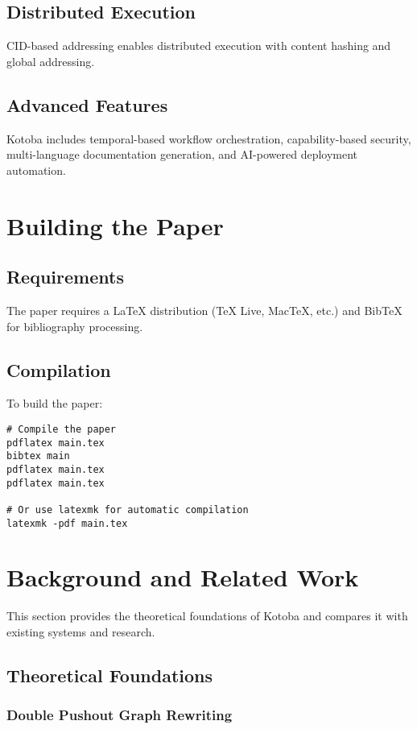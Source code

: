\documentclass[11pt,a4paper]{article}
\begin{document}
\subsection{Distributed Execution}
CID-based addressing enables distributed execution with content hashing and global addressing.

\subsection{Advanced Features}
Kotoba includes temporal-based workflow orchestration, capability-based security, multi-language documentation generation, and AI-powered deployment automation.

\section{Building the Paper}
\label{sec:building}

\subsection{Requirements}
The paper requires a LaTeX distribution (TeX Live, MacTeX, etc.) and BibTeX for bibliography processing.

\subsection{Compilation}
To build the paper:
\begin{verbatim}
# Compile the paper
pdflatex main.tex
bibtex main
pdflatex main.tex
pdflatex main.tex

# Or use latexmk for automatic compilation
latexmk -pdf main.tex
\end{verbatim}

\section{Background and Related Work}
\label{sec:background}

This section provides the theoretical foundations of Kotoba and compares it with existing systems and research.

\subsection{Theoretical Foundations}
\label{subsec:theory}

\subsubsection{Double Pushout Graph Rewriting}
\label{subsubsec:dpo}
\end{document}
